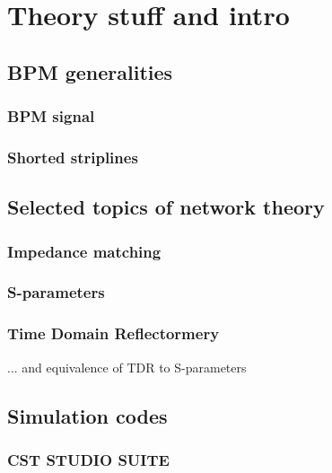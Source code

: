 \chapter{Theory stuff and intro}

\section[BPM generalities]{BPM generalities}

\subsection[BPM signal]{BPM signal}

\subsection[Shorted striplines]{Shorted striplines}



\section[Selected topics of network theory]{Selected topics of network theory}

\subsection[Impedance matching]{Impedance matching}

\subsection[S-parameters]{S-parameters}

\subsection[Time Domain Reflectormery]{Time Domain Reflectormery}

... and equivalence of TDR to S-parameters

\section[Simulation codes]{Simulation codes}

\subsection[CST STUDIO SUITE\textregistered]{CST STUDIO SUITE\textregistered}

